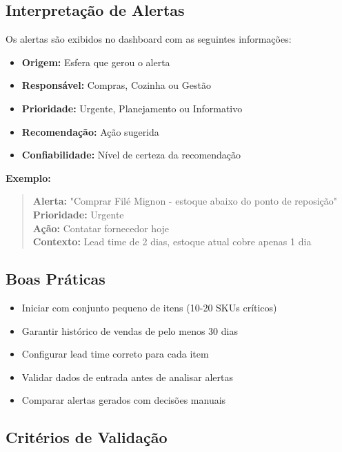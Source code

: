 \subsection{Interpretação de Alertas}

Os alertas são exibidos no dashboard com as seguintes informações:

\begin{itemize}[leftmargin=2em]
  \item \textbf{Origem:} Esfera que gerou o alerta
  \item \textbf{Responsável:} Compras, Cozinha ou Gestão
  \item \textbf{Prioridade:} Urgente, Planejamento ou Informativo
  \item \textbf{Recomendação:} Ação sugerida
  \item \textbf{Confiabilidade:} Nível de certeza da recomendação
\end{itemize}

\textbf{Exemplo:}

\begin{quote}
\textbf{Alerta:} "Comprar Filé Mignon - estoque abaixo do ponto de reposição" \\
\textbf{Prioridade:} Urgente \\
\textbf{Ação:} Contatar fornecedor hoje \\
\textbf{Contexto:} Lead time de 2 dias, estoque atual cobre apenas 1 dia
\end{quote}

\subsection{Boas Práticas}

\begin{infobox}
\begin{itemize}[leftmargin=1em, topsep=0pt]
  \item Iniciar com conjunto pequeno de itens (10-20 SKUs críticos)
  \item Garantir histórico de vendas de pelo menos 30 dias
  \item Configurar lead time correto para cada item
  \item Validar dados de entrada antes de analisar alertas
  \item Comparar alertas gerados com decisões manuais
\end{itemize}
\end{infobox}

\subsection{Critérios de Validação}

